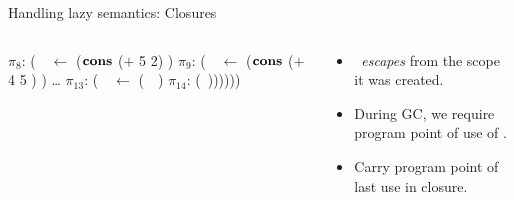 \documentclass[xcolor=x11names,compress,mathserif]{beamer}
\renewcommand{\(}{\begin{columns}}
\renewcommand{\)}{\end{columns}}
\newcommand{\<}[1]{\begin{column}{#1}}
\renewcommand{\>}{\end{column}}
\begin{document}
\begin{frame}{Handling lazy semantics: Closures}
  \begin{columns}[c]
    \begin{column}[T]{0.5\textwidth}
      \hspace*{-.3cm}\renewcommand{\arraystretch}{1}{
        \begin{uprogram}
          \hspace*{-.4cm} $\pi_8\!\!:\, $(\LET\  \px\  $\leftarrow$ ($\mbox{$\mathbf{cons}$}$ ($+$ 5 2) \NIL)  \IN
             \hspace*{-.3cm}   $\pi_9\!\!:\, $(\LET\ \pz\ $\leftarrow$ ($\mbox{$\mathbf{cons}$}$ ($+$ 4 5 ) \px) \IN
             \ldots
             \hspace*{-.35cm}  $\pi_{13}\!\!:\, $(\LET\ \pb\  $\leftarrow$ (\CONS\  \pz\ \NIL) \IN
             \hspace*{-.38cm} $\pi_{14}\!\!:\,$(\RETURN\ \pb))))))
   \end{uprogram}}
    \end{column}
    \begin{column}[T]{0.5\textwidth}
      \begin{itemize}
      \item \pz\ {\em escapes} from the scope it was created.
      \item During GC, we require program point of use of \pz.
      \item Carry program point of last use in closure.
      \end{itemize}
    \end{column}
  \end{columns}
\end{frame}
\end{document}
